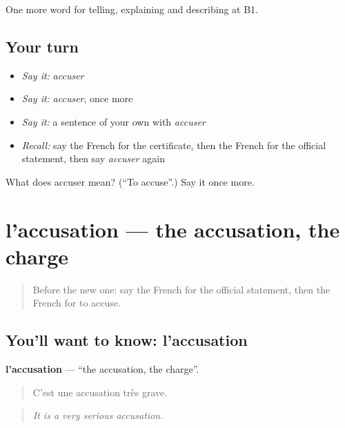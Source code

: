 \begin{grammarlens}[title={What you've built}]
One more word for telling, explaining and describing at B1.
\end{grammarlens}

\subsection*{Your turn}
\begin{itemize}
\raggedright
  \item \emph{Say it:} \emph{accuser}
  \item \emph{Say it:} \emph{accuser}, once more
  \item \emph{Say it:} a sentence of your own with \emph{accuser}
  \item \emph{Recall:} say the French for the certificate, then the French for the official statement, then say \emph{accuser} again
\end{itemize}

\begin{tcolorbox}[breakable,colback=teal!4,colframe=teal!35!black,title={Before you move on}]
What does accuser mean? (\textquotedblleft{}To accuse\textquotedblright{}.) Say it once more.
\end{tcolorbox}
\section[l'accusation]{l'accusation — the accusation, the charge}

\label{lesson:FR-C386-accusation}



\begin{quote}
Before the new one: say the French for the official statement, then the French for to accuse.
\end{quote}

\subsection*{You'll want to know: l'accusation}
\textbf{l'accusation} — \textquotedblleft{}the accusation, the charge\textquotedblright{}.

\begin{quote}
C'est une accusation très grave.
\end{quote}

\begin{quote}
\emph{It is a very serious accusation.}
\end{quote}

